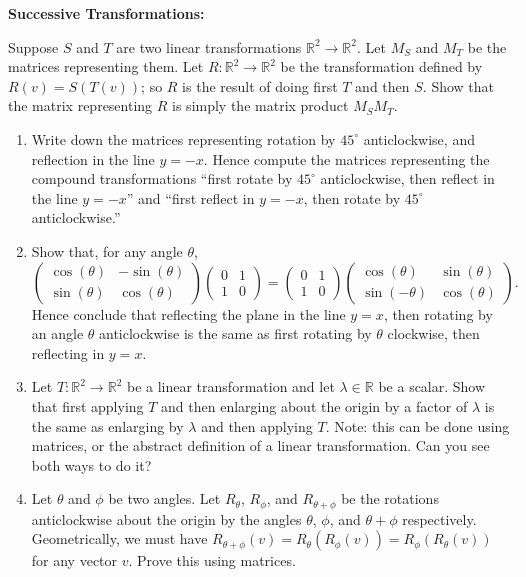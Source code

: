\documentclass{article}
\begin{document}
\clearpage


\textbf{Successive Transformations:}\bigskip

Suppose $S$ and $T$ are two linear transformations $\mathbb{R}^2\to\mathbb{R}^2$. Let $M_S$ and $M_T$ be the matrices representing them. Let $R:\mathbb{R}^2\to\mathbb{R}^2$ be the transformation defined by $R(v)=S(T(v))$; so $R$ is the result of doing first $T$ and then $S$. Show that the matrix representing $R$ is simply the matrix product $M_SM_T$.\bigskip


\begin{enumerate}
	\item Write down the matrices representing rotation by $45^\circ$ anticlockwise, and reflection in the line $y=-x$. Hence compute the matrices representing the compound transformations ``first rotate by $45^\circ$ anticlockwise, then reflect in the line $y=-x$'' and ``first reflect in $y=-x$, then rotate by $45^\circ$ anticlockwise.''
	\item Show that, for any angle $\theta$,
		\[\left(\begin{array}{cc} \cos(\theta)&-\sin(\theta)\\\sin(\theta)&\cos(\theta)\end{array}\right)\left(\begin{array}{cc}0&1\\1&0\end{array}\right)=\left(\begin{array}{cc}0&1\\1&0\end{array}\right)\left(\begin{array}{cc} \cos(\theta)&\sin(\theta)\\\sin(-\theta)&\cos(\theta)\end{array}\right).\]
		Hence conclude that reflecting the plane in the line $y=x$, then rotating by an angle $\theta$ anticlockwise is the same as first rotating by $\theta$ clockwise, then reflecting in $y=x$.
	\item Let $T\colon\mathbb{R}^2\to\mathbb{R}^2$ be a linear transformation and let $\lambda\in\mathbb{R}$ be a scalar. Show that first applying $T$ and then enlarging about the origin by a factor of $\lambda$ is the same as enlarging by $\lambda$ and then applying $T$. Note: this can be done using matrices, or the abstract definition of a linear transformation. Can you see both ways to do it?
	\item Let $\theta$ and $\phi$ be two angles. Let $R_\theta$, $R_\phi$, and $R_{\theta+\phi}$ be the rotations anticlockwise about the origin by the angles $\theta$, $\phi$, and $\theta+\phi$ respectively. Geometrically, we must have $R_{\theta+\phi}(v)=R_\theta(R_\phi(v))=R_\phi(R_\theta(v))$ for any vector $v$. Prove this using matrices.

\end{enumerate}
\end{document}
